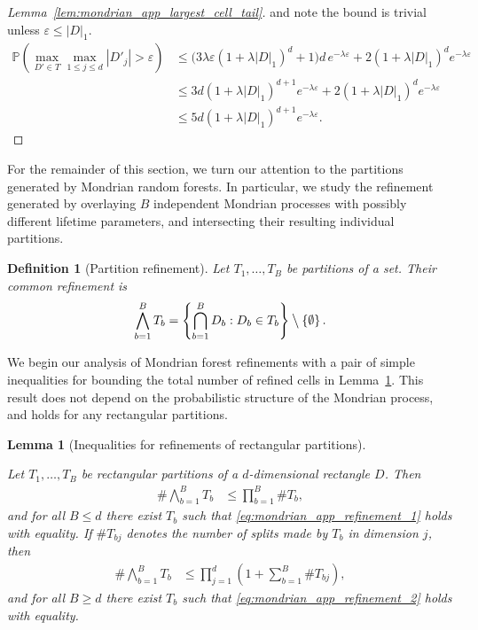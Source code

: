 \documentclass[11pt,lof]{puthesis}
\renewcommand{\P}{\ensuremath{\mathbb{P}}}
\newcommand{\bigsetminus}{\mathbin{\big\backslash}}
\theoremstyle{break}
\newtheorem{lemma}{Lemma}[section]
\newtheorem{definition}{Definition}[section]
\theoremstyle{proof}
\newtheorem{proof}{Proof}
\begin{document}
\begin{proof}[Lemma~\ref{lem:mondrian_app_largest_cell_tail}]
  and note the bound is trivial unless $\varepsilon \leq |D|_1$.
  \begin{align*}
    \P\left(
      \max_{D' \in T}
      \max_{1 \leq j \leq d}
      |D'_j| > \varepsilon
    \right)
    &\leq
    \big( 3 \lambda \varepsilon (1 + \lambda |D|_1)^d + 1 \big)
    d \, e^{-\lambda \varepsilon}
    + 2 (1 + \lambda |D|_1)^d
    e^{-\lambda \varepsilon} \\
    &\leq
    3d (1 + \lambda |D|_1)^{d+1}
    e^{-\lambda \varepsilon}
    + 2 (1 + \lambda |D|_1)^d
    e^{-\lambda \varepsilon} \\
    &\leq
    5d (1 + \lambda |D|_1)^{d+1}
    e^{-\lambda \varepsilon}.
  \end{align*}
\end{proof}

For the remainder of this section, we turn our attention to the partitions
generated by Mondrian random forests. In particular, we study the refinement
generated by overlaying $B$ independent Mondrian processes with possibly
different lifetime parameters, and intersecting their resulting individual
partitions.

\begin{definition}[Partition refinement]%
  Let $T_1, \ldots, T_B$ be partitions of a set.
  Their common refinement is
  \begin{align*}
    \bigwedge_{b=1}^B T_b
    = \left\{
      \bigcap_{b=1}^B D_b:
      D_b \in T_b
    \right\}
    \bigsetminus
    \left\{ \emptyset \right\}.
  \end{align*}
\end{definition}

We begin our analysis of Mondrian forest refinements with a pair of simple
inequalities for bounding the total number of refined cells
in Lemma~\ref{lem:mondrian_app_refinement_inequalities}. This result does not
depend
on the probabilistic structure of the Mondrian process, and holds for any
rectangular partitions.

\begin{lemma}[Inequalities for refinements of rectangular partitions]
  \label{lem:mondrian_app_refinement_inequalities}

  Let $T_1, \ldots, T_B$ be rectangular partitions of a $d$-dimensional
  rectangle $D$. Then
  \begin{align}
    \label{eq:mondrian_app_refinement_1}
    \# \bigwedge_{b=1}^B T_b
    &\leq \prod_{b=1}^B \# T_b,
  \end{align}
  and for all $B \leq d$ there exist $T_b$ such that
  \eqref{eq:mondrian_app_refinement_1} holds with equality.
  If $\# T_{b j}$ denotes the number of splits
  made by $T_b$ in dimension $j$, then
  \begin{align}
    \label{eq:mondrian_app_refinement_2}
    \# \bigwedge_{b=1}^B T_b
    &\leq \prod_{j=1}^d
    \left( 1 + \sum_{b=1}^B \# T_{b j} \right),
  \end{align}
  and for all $B \geq d$ there exist $T_b$ such that
  \eqref{eq:mondrian_app_refinement_2} holds with equality.

\end{lemma}
\end{document}
